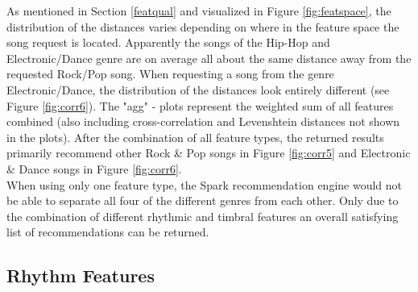 \noindent As mentioned in Section \ref{featqual} and visualized in Figure \ref{fig:featspace}, the distribution of the distances varies depending on where in the feature space the song request is located. Apparently the songs of the Hip-Hop and Electronic/Dance genre are on average all about the same distance away from the requested Rock/Pop song. When requesting a song from the genre Electronic/Dance, the distribution of the distances look entirely different (see Figure \ref{fig:corr6}).
\noindent The "agg" - plots represent the weighted sum of all features combined (also including cross-correlation and Levenshtein distances not shown in the plots). After the combination of all feature types, the returned results primarily recommend other Rock \& Pop songs in Figure \ref{fig:corr5} and Electronic \& Dance songs in Figure \ref{fig:corr6}.\\
When using only one feature type, the Spark recommendation engine would not be able to separate all four of the different genres from each other. Only due to the combination of different rhythmic and timbral features an overall satisfying list of recommendations can be returned.\\

\subsection{Rhythm Features}\label{rhythmrec}

